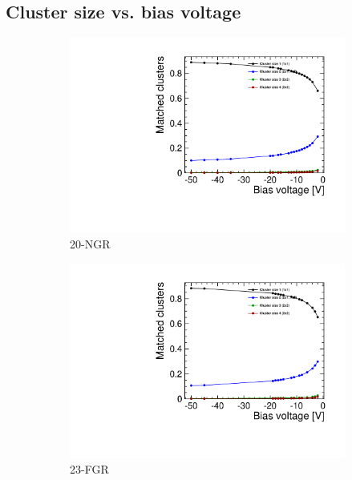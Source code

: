 \subsection{Cluster size vs. bias voltage}
\begin{figure}[htbp] \centering
  \begin{subfigure}[b]{0.33\textwidth}
    \includegraphics[width=\textwidth]{./figures/TestBeam/cluSize_bias_W0019_G07.pdf}
    \caption{20-NGR}
  \end{subfigure} \hfill
  \begin{subfigure}[b]{0.33\textwidth}
    \includegraphics[width=\textwidth]{./figures/TestBeam/cluSize_bias_W0019_F07.pdf}
    \caption{23-FGR}
  \end{subfigure}\hfill
  \begin{subfigure}[b]{0.33\textwidth}

\end{subfigure}
\end{figure}
